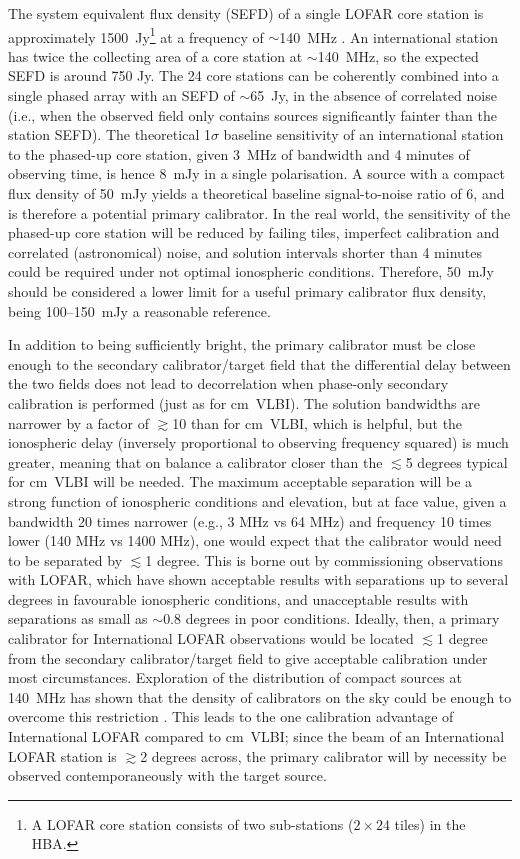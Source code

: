\documentclass[graybox]{svmult}
\begin{document}
The system equivalent flux density (SEFD) of a single LOFAR core station is
approximately 1500~Jy\footnote{A LOFAR core station consists of two
sub-stations ($2\times24$ tiles) in the HBA.} at a frequency of $\sim$140~MHz
\citep{vanhaarlem13}.  An international station has twice the collecting area
of a core station at $\sim$140~MHz, so the expected SEFD is around 750 Jy.  The
24 core stations can be coherently combined into a single phased array with an
SEFD of $\sim$65~Jy, in the absence of correlated noise (i.e., when the
observed field only contains sources significantly fainter than the station
SEFD).  The theoretical 1$\sigma$ baseline sensitivity of an international
station to the phased-up core station, given 3~MHz of bandwidth and 4 minutes
of observing time, is hence 8~mJy in a single polarisation.  A source with a
compact flux density of 50~mJy yields a theoretical baseline signal-to-noise
ratio of 6, and is therefore a potential primary calibrator. In the real world,
the sensitivity of the phased-up core station will be reduced by failing tiles,
imperfect calibration and correlated (astronomical) noise, and solution
intervals shorter than 4 minutes could be required under not optimal
ionospheric conditions.  Therefore, 50~mJy should be considered a lower limit
for a useful primary calibrator flux density, being 100--150~mJy a reasonable
reference.

In addition to being sufficiently bright, the primary calibrator must be close
enough to the secondary calibrator/target field that the differential delay
between the two fields does not lead to decorrelation when phase-only secondary
calibration is performed (just as for cm~VLBI).  The solution bandwidths are
narrower by a factor of $\gtrsim$10 than for cm~VLBI, which is helpful, but the
ionospheric delay (inversely proportional to observing frequency squared) is
much greater, meaning that on balance a calibrator closer than the $\lesssim$5
degrees typical for cm~VLBI will be needed.  The maximum acceptable separation
will be a strong function of ionospheric conditions and elevation, but at face
value, given a bandwidth 20 times narrower (e.g., 3 MHz vs 64 MHz) and
frequency 10 times lower (140 MHz vs 1400 MHz), one would expect that the
calibrator would need to be separated by $\lesssim$1 degree.  This is borne out
by commissioning observations with LOFAR, which have shown acceptable results
with separations up to several degrees in favourable ionospheric conditions,
and unacceptable results with separations as small as $\sim$0.8 degrees in poor
conditions.  Ideally, then, a primary calibrator for International LOFAR
observations would be located $\lesssim$1 degree from the secondary
calibrator/target field to give acceptable calibration under most
circumstances. Exploration of the distribution of compact sources at 140~MHz
has shown that the density of calibrators on the sky could be enough to
overcome this restriction \citep{moldon15}. This leads to the one calibration
advantage of International LOFAR compared to cm~VLBI; since the beam of an
International LOFAR station is $\gtrsim$2 degrees across, the primary
calibrator will by necessity be observed contemporaneously with the target
source.
\end{document}
